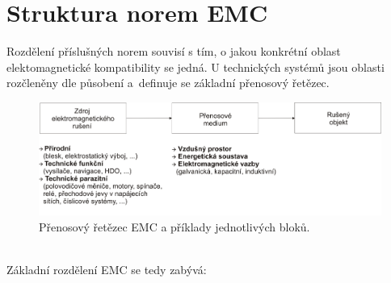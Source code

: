 \section{Struktura norem EMC}
Rozdělení příslušných norem souvisí s tím, o jakou konkrétní oblast elektomagnetické kompatibility se jedná. U technických systémů jsou oblasti rozčleněny dle působení a~definuje se základní přenosový řetězec. 
\begin{figure}[!h]
	\centering
	\includegraphics[width=14.5cm]{emc_retezec.png}
	\caption{Přenosový řetězec EMC a příklady jednotlivých bloků.}
	\label{obr:emc_retezec}
\end{figure}\\
Základní rozdělení EMC se tedy zabývá:
